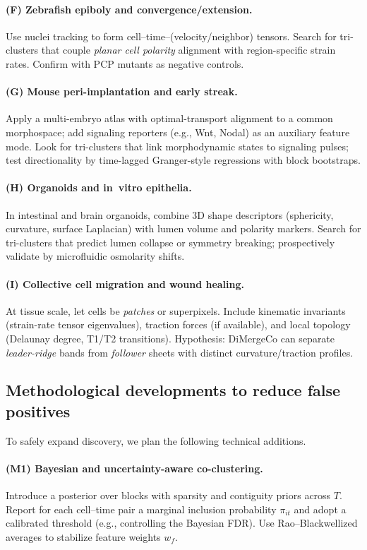 \documentclass[unnumsec,webpdf,modern,large,namedate]{oup-authoring-template}%
\theoremstyle{thmstyleone}\newtheorem{theorem}{Theorem}
\theoremstyle{thmstyletwo}\newtheorem{example}{Example}
\theoremstyle{thmstylethree}\newtheorem{definition}{Definition}
\begin{document}
\paragraph{(F) Zebrafish epiboly and convergence/extension.}
Use nuclei tracking to form cell--time--(velocity/neighbor) tensors.  Search for tri-clusters
that couple \emph{planar cell polarity} alignment with region-specific strain rates.
Confirm with PCP mutants as negative controls.

\paragraph{(G) Mouse peri-implantation and early streak.}
Apply a multi-embryo atlas with optimal-transport alignment to a common morphospace; add
signaling reporters (e.g., Wnt, Nodal) as an auxiliary feature mode.  Look for
tri-clusters that link morphodynamic states to signaling pulses; test directionality by
 time-lagged Granger-style regressions with block bootstraps.

\paragraph{(H) Organoids and in~vitro epithelia.}
In intestinal and brain organoids, combine 3D shape descriptors (sphericity, curvature,
surface Laplacian) with lumen volume and polarity markers.  Search for tri-clusters that
predict lumen collapse or symmetry breaking; prospectively validate by microfluidic
osmolarity shifts.

\paragraph{(I) Collective cell migration and wound healing.}
At tissue scale, let cells be \emph{patches} or superpixels.  Include kinematic
invariants (strain-rate tensor eigenvalues), traction forces (if available), and local
topology (Delaunay degree, T1/T2 transitions).  Hypothesis: DiMergeCo can separate
\emph{leader-ridge} bands from \emph{follower} sheets with distinct curvature/traction
profiles.

\subsection{Methodological developments to reduce false positives}
To safely expand discovery, we plan the following technical additions.

\paragraph{(M1) Bayesian and uncertainty-aware co-clustering.}
Introduce a posterior over blocks with sparsity and contiguity priors across $T$.
Report for each cell--time pair a marginal inclusion probability $\pi_{it}$ and adopt
 a calibrated threshold (e.g., controlling the Bayesian FDR).  Use Rao–Blackwellized
averages to stabilize feature weights $w_f$.
\end{document}
